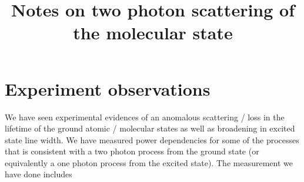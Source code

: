 \documentclass[10pt,fleqn]{article}
\title{Notes on two photon scattering of the molecular state}
\begin{document}
\maketitle

\raggedright

\section{Experiment observations}
We have seen experimental evidences of an anomalous scattering / loss in the
lifetime of the ground atomic / molecular states as well as broadening in excited state
line width. We have measured power dependencies for some of the processes that is
consistent with a two photon process from the ground state (or equivalently a one
photon process from the excited state). The measurement we have done includes
\end{document}
